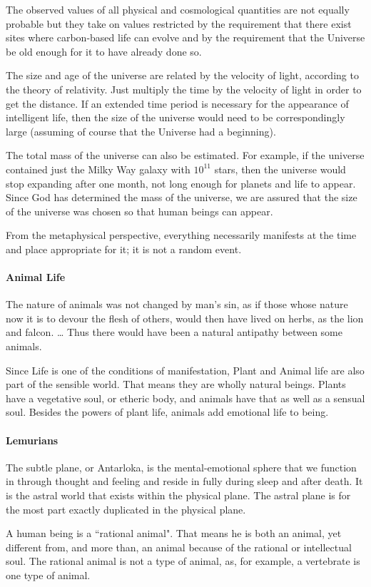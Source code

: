 \begin{quotex}
The observed values of all physical and cosmological quantities are not equally probable but they take on values restricted by the requirement that there exist sites where carbon-based life can evolve and by the requirement that the Universe be old enough for it to have already done so. 

\end{quotex}
The size and age of the universe are related by the velocity of light, according to the theory of relativity. Just multiply the time by the velocity of light in order to get the distance. If an extended time period is necessary for the appearance of intelligent life, then the size of the universe would need to be correspondingly large (assuming of course that the Universe had a beginning).

The total mass of the universe can also be estimated. For example, if the universe contained just the Milky Way galaxy with $10^{11}$ stars, then the universe would stop expanding after one month, not long enough for planets and life to appear. Since God has determined the mass of the universe, we are assured that the size of the universe was chosen so that human beings can appear.

From the metaphysical perspective, everything necessarily manifests at the time and place appropriate for it; it is not a random event.

\paragraph{Animal Life}
\begin{quotex}
The nature of animals was not changed by man's sin, as if those whose nature now it is to devour the flesh of others, would then have lived on herbs, as the lion and falcon. … Thus there would have been a natural antipathy between some animals. 

\end{quotex}
Since Life is one of the conditions of manifestation, Plant and Animal life are also part of the sensible world. That means they are wholly natural beings. Plants have a vegetative soul, or etheric body, and animals have that as well as a sensual soul. Besides the powers of plant life, animals add emotional life to being.

\paragraph{Lemurians}
\begin{quotex}
The subtle plane, or Antarloka, is the mental-emotional sphere that we function in through thought and feeling and reside in fully during sleep and after death. It is the astral world that exists within the physical plane. The astral plane is for the most part exactly duplicated in the physical plane. 

\end{quotex}
A human being is a ``rational animal". That means he is both an animal, yet different from, and more than, an animal because of the rational or intellectual soul. The rational animal is not a type of animal, as, for example, a vertebrate is one type of animal.

